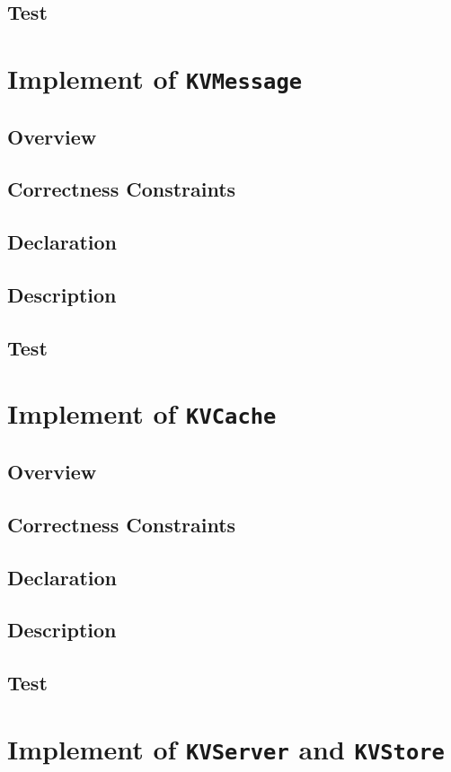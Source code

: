 \documentclass{article}
\begin{document}
\subsection{Test}

\section{Implement of \texttt{KVMessage}}
\subsection{Overview}
\subsection{Correctness Constraints}
\subsection{Declaration}
\subsection{Description}
\subsection{Test}

\section{Implement of \texttt{KVCache}}
\subsection{Overview}
\subsection{Correctness Constraints}
\subsection{Declaration}
\subsection{Description}
\subsection{Test}

\section{Implement of \texttt{KVServer} and \texttt{KVStore}}
\end{document}
